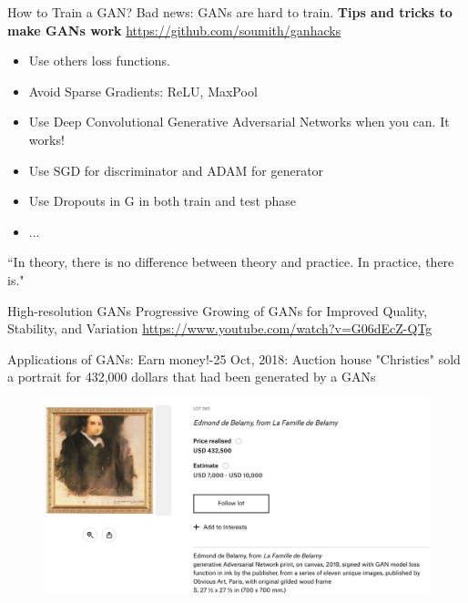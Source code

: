 \documentclass[xcolor=pdftex,dvipsnames,table,mathserif]{beamer}
\begin{document}
\begin{frame}{How to Train a GAN?}
\alert{Bad news: GANs are hard to train}.
\textbf{ Tips and tricks to make GANs work}
\url{https://github.com/soumith/ganhacks}
\begin{itemize}
\item Use others loss functions.
\item Avoid Sparse Gradients: ReLU, MaxPool
\item Use Deep Convolutional Generative Adversarial Networks when you can. It works!
\item Use SGD for discriminator and ADAM for generator
\item Use Dropouts in G in both train and test phase
\item ...
\end{itemize}
\alert{``In theory, there is no difference between theory and practice. In practice, there is."}
\end{frame}

\begin{frame}{High-resolution GANs}
Progressive Growing of GANs for Improved Quality, Stability, and Variation \cite{karras2017progressive}
\url{https://www.youtube.com/watch?v=G06dEcZ-QTg}
\end{frame}

\begin{frame}{Applications of GANs: Earn money!}-25 Oct, 2018:  Auction house "Christies" sold a portrait for 432,000 dollars that had been generated by a GANs
 \begin{figure}
\includegraphics[width=.95\columnwidth]{../graphics/Christie}
\end{figure}
\end{frame}
\end{document}
